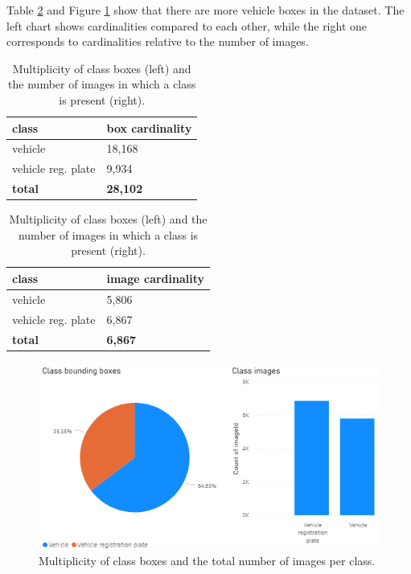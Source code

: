 Table \ref{tab:class_multiplicity} and Figure \ref{fig:class_multiplicity} show that there are more vehicle boxes in the dataset. The left chart shows cardinalities compared to each other, while the right one corresponds to cardinalities relative to the number of images.

\begin{table}[H]
 \caption{Multiplicity of class boxes (left) and the number of images in which a class is present (right).}
 \label{tab:class_multiplicity}
\begin{minipage}{.5\linewidth}
 \centering
\begin{tabular}{ll}
    class & box cardinality\\ \hline
    vehicle & 18,168 \\
    vehicle reg. plate & 9,934 \\
    \textbf{total} & \textbf{28,102} \\
\end{tabular}
\end{minipage}%
\begin{minipage}{.5\linewidth}
 \centering
\begin{tabular}{ll}
    class & image cardinality\\ \hline
    vehicle & 5,806 \\
    vehicle reg. plate & 6,867 \\
    \textbf{total} & \textbf{6,867} \\
\end{tabular}
\end{minipage} 
\end{table}

\begin{figure}[H]
 \centerline{\includegraphics[width=1.0\columnwidth]{.//Figure/PlateLocalization/class_multiplicity.png}}
 \caption{Multiplicity of class boxes and the total number of images per class.}
 \label{fig:class_multiplicity}
\end{figure}

